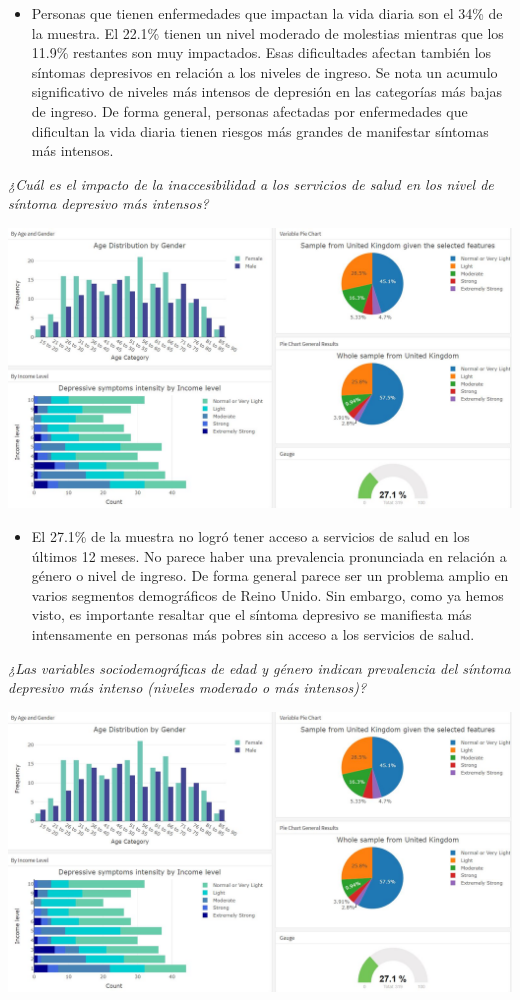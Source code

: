 \documentclass{report}
\begin{document}
\begin{itemize}
\item Personas que tienen enfermedades que impactan la vida diaria son el 34\% de la muestra. El 22.1\% tienen un nivel moderado de molestias mientras que los 11.9\% restantes son muy impactados. Esas dificultades afectan también los síntomas depresivos en relación a los niveles de ingreso. Se nota un acumulo significativo de niveles más intensos de depresión en las categorías más bajas de ingreso. De forma general, personas afectadas por enfermedades que dificultan la vida diaria tienen riesgos más grandes de manifestar síntomas más intensos.
\end{itemize}

\textit{¿Cuál es el impacto de la inaccesibilidad a los servicios de salud en los nivel de síntoma 
depresivo más intensos? }

\includegraphics[width=1\textwidth]{dep_no_access.JPG}

\begin{itemize}
\item El 27.1\% de la muestra no logró tener acceso a servicios de salud en los últimos 12 meses. No parece haber una prevalencia pronunciada en relación a género o nivel de ingreso. De forma general parece ser un problema amplio en varios segmentos demográficos de Reino Unido. Sin embargo, como ya hemos visto, es importante resaltar que el síntoma depresivo se manifiesta más intensamente en personas más pobres sin acceso a los servicios de salud.
\end{itemize}

\textit{¿Las variables sociodemográficas de edad y género indican prevalencia del síntoma 
depresivo más intenso (niveles moderado o más intensos)?}

\includegraphics[width=1\textwidth]{dep_no_access.JPG}
\end{document}
